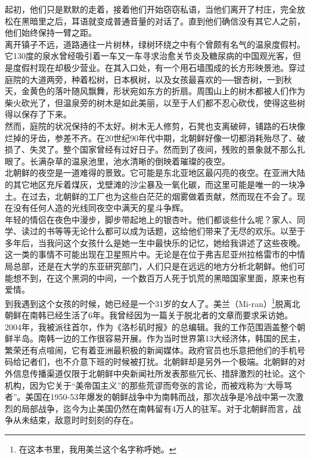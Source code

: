 起初，他们只是默默的走着，接着他们开始窃窃私语，当他们离开了村庄，完全放松在黑暗里之后，耳语就变成普通音量的对话了。直到他们确信没有其它人之前，他们始终保持一臂之距。\\

离开镇子不远，道路通往一片树林，绿树环绕之中有个曾颇有名气的温泉度假村。它130度的泉水曾经吸引着一车又一车寻求治愈关节炎及糖尿病的中国观光客，但是度假村现在却极少营业。在其入口处，有一个用石墙围成的长方形映景池。穿过庭院的大道两旁，种着松树，日本枫树，以及女孩最喜欢的──银杏树，一到秋天，金黄色的落叶随风飘舞，形状宛如东方的折扇。周围山上的树木都被人们作为柴火砍光了，但温泉旁的树木是如此美丽，以至于人们都不忍心砍伐，使得这些树得以保存了下来。\\

然而，庭院的状况保持的不太好。树木无人修剪，石凳也支离破碎，铺路的石块像烂掉的牙齿，参差不齐。在20世纪90年代中期，北朝鲜好像一切都消耗殆尽了、破损了、失灵了。整个国家曾经有过好日子。然而到了夜间，残败的景象就不那么扎眼了。长满杂草的温泉池里，池水清晰的倒映着璀璨的夜空。\\

北朝鲜的夜空是一道难得的景致。它可能是东北亚地区最闪亮的夜空。在亚洲大陆的其它地区充斥着煤灰，戈壁滩的沙尘暴及一氧化碳，而这里可能是唯一的一块净土。在过去，北朝鲜的工厂也为这些白茫茫的烟雾做着贡献，然而现在不会了。现在没有任何人造的光线同夜空中满天的星斗争辉。\\

年轻的情侣在夜色中漫步，脚步带起地上的银杏叶。他们都谈些什么呢？家人、同学、读过的书等等无论什么都可以成为话题，这给他们带来了无尽的欢乐。以至于多年后，当我问这个女孩什么是她一生中最快乐的记忆，她给我讲述了这些夜晚。\\

这一类的事情不可能出现在卫星照片中。无论是在位于弗吉尼亚州拉格雷市的中情局总部，还是在大学的东亚研究部门，人们只是在远远的地方分析北朝鲜。他们可能想不到，在这个黑洞的中间，一个数百万人死于饥荒的黑暗国家里面，原来也有爱情。\\

到我遇到这个女孩的时候，她已经是一个31岁的女人了。美兰（Mi-ran）\footnote{在这本书里，我用美兰这个名字称呼她。}脱离北朝鲜在南韩已经生活了6年。我曾经因为一篇关于脱北者的文章而要求采访她。\\

2004年，我被派往首尔，作为《洛杉矶时报》的总编辑。我的工作范围涵盖整个朝鲜半岛。南韩一边的工作很容易开展。作为当时世界第13大经济体，韩国的民主，繁荣还有点喧闹，它有着亚洲最积极的新闻媒体。政府官员也乐意把他们的手机号码给记者们，也不介意下班的时候被打扰。北朝鲜却是另外一个极端。北朝鲜的对外信息传播渠道仅限于北朝鲜中央新闻社所发表那些冗长、措辞激烈的社论。这个机构，因为它关于“美帝国主义”的那些荒谬而夸张的言论，而被戏称为“大辱骂者”。美国在1950-53年爆发的朝鲜战争中为南韩而战，那次战争是冷战中第一次激烈的局部战争，迄今为止美国仍然在南韩留有4万人的驻军。对于北朝鲜而言，战争从未结束，敌意时时刻刻的存在。\\

